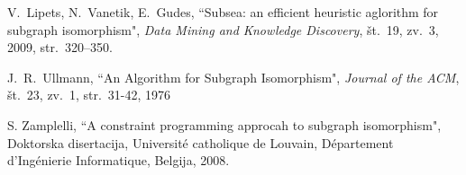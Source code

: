 \documentclass[a4paper, 12pt, ]{book}
\begin{document}
\begin{thebibliography}{99}

	 V.~Lipets, N.~Vanetik, E.~Gudes, ``Subsea: an efficient heuristic aglorithm for subgraph isomorphism",
		\textit {Data Mining and Knowledge Discovery}, št.~19, zv.~3, 2009, str.~320--350.

	 J.~R.~Ullmann, ``An Algorithm for Subgraph Isomorphism",
		\textit{Journal of the ACM}, št.~23, zv.~1, str.~31-42, 1976

	 S. Zamplelli, ``A constraint programming approcah to subgraph isomorphism", Doktorska disertacija, 
	Universit\'{e} catholique de Louvain, D\'{e}partement d’Ing\'{e}nierie Informatique, Belgija, 2008.

\end{thebibliography}
\end{document}
